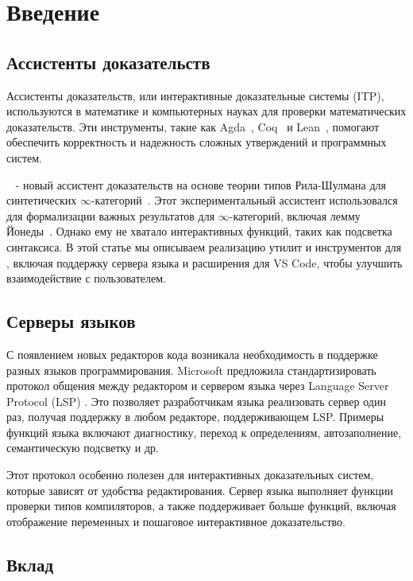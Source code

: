 \chapter{Введение}
\label{chap:intro}

\section{Ассистенты доказательств}

Ассистенты доказательств, или интерактивные доказательные системы (ITP), используются в математике и компьютерных науках для проверки математических доказательств. Эти инструменты, такие как Agda~\cite{BoveDybjerNorell2009}, Coq~\cite{BertotCasteran2013} и Lean~\cite{deMouraUllrich2021}, помогают обеспечить корректность и надежность сложных утверждений и программных систем.

\Rzk{}~\cite{Kudasov2023-github-rzk} - новый ассистент доказательств на основе теории типов Рила-Шулмана для синтетических $\infty$-категорий~\cite{RiehlShulman2017, Riehl2023}. Этот экспериментальный ассистент использовался для формализации важных результатов для $\infty$-категорий, включая лемму Йонеды~\cite{Kudasov2023}. Однако ему не хватало интерактивных функций, таких как подсветка синтаксиса. В этой статье мы описываем реализацию утилит и инструментов для \Rzk{}, включая поддержку сервера языка и расширения для VS Code, чтобы улучшить взаимодействие с пользователем.

\section{Серверы языков}

С появлением новых редакторов кода возникала необходимость в поддержке разных языков программирования. Microsoft предложила стандартизировать протокол общения между редактором и сервером языка через Language Server Protocol (LSP) \cite{Gunasinghe2022}. Это позволяет разработчикам языка реализовать сервер один раз, получая поддержку в любом редакторе, поддерживающем LSP. Примеры функций языка включают диагностику, переход к определениям, автозаполнение, семантическую подсветку и др.

Этот протокол особенно полезен для интерактивных доказательных систем, которые зависят от удобства редактирования. Сервер языка выполняет функции проверки типов компиляторов, а также поддерживает больше функций, включая отображение переменных и пошаговое интерактивное доказательство.

\section{Вклад}

